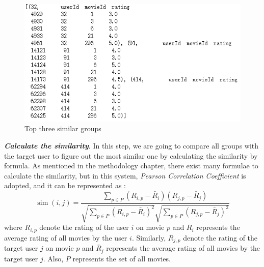 \begin{figure}[htbp]
\centering
\includegraphics[scale =0.7]{figure/targecf2.png}
\caption{Top three similar groups}
\end{figure}

\textbf{\textit{Calculate the similarity}}. In this step, we are going to compare all groups with the target user to figure out the most similar one by calculating the similarity by formula. As mentioned in the methodology chapter, there exist many formulae to calculate the similarity, but in this system, \textit{Pearson Correlation Coefficient} is adopted, and it can be represented as :
\begin{equation}
    \operatorname{sim}(i, j)=\frac{\sum_{p \in P}\left(R_{i, p}-\bar{R}_{i}\right)\left(R_{j, p}-\bar{R}_{j}\right)}{\sqrt{\sum_{p \in P}\left(R_{i, p}-\bar{R}_{i}\right)^{2}} \sqrt{\sum_{p \in P}\left(R_{j, p}-\bar{R}_{j}\right)^{2}}}
\end{equation}
where $R_{i, p}$ denote the rating of the user $i$ on movie $p$ and $\bar{R}_{i}$ represents the average rating of all movies by the user $i$. Similarly, $R_{j, p}$ denote the rating of the target user $j$ on movie $p$ and $\bar{R}_{j}$ represents the average rating of all movies by the target user $j$. Also, $P$ represents the set of all movies.


